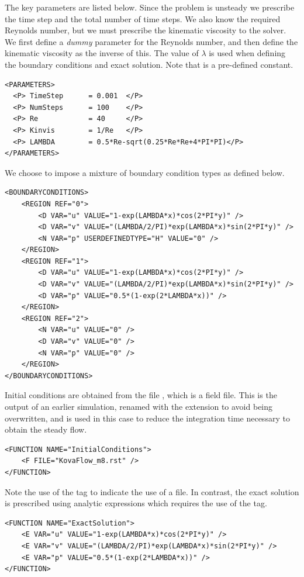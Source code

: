 The key parameters are listed below. Since the problem is unsteady we prescribe
the time step and the total number of time steps. We also know the required
Reynolds number, but we must prescribe the kinematic viscosity to the solver. We
first define a \emph{dummy} parameter for the Reynolds number, and then define
the kinematic viscosity as the inverse of this. The value of $\lambda$ is used
when defining the boundary conditions and exact solution. Note that 
is a pre-defined constant.

\begin{lstlisting}[style=XMLStyle]
<PARAMETERS>
  <P> TimeStep      = 0.001  </P>
  <P> NumSteps      = 100    </P>
  <P> Re            = 40     </P>
  <P> Kinvis        = 1/Re   </P>
  <P> LAMBDA        = 0.5*Re-sqrt(0.25*Re*Re+4*PI*PI)</P>
</PARAMETERS>
\end{lstlisting}

We choose to impose a mixture of boundary condition types as defined below.

\begin{lstlisting}[style=XMLStyle]
<BOUNDARYCONDITIONS>
    <REGION REF="0">
        <D VAR="u" VALUE="1-exp(LAMBDA*x)*cos(2*PI*y)" />
        <D VAR="v" VALUE="(LAMBDA/2/PI)*exp(LAMBDA*x)*sin(2*PI*y)" />
        <N VAR="p" USERDEFINEDTYPE="H" VALUE="0" />
    </REGION>
    <REGION REF="1">
        <D VAR="u" VALUE="1-exp(LAMBDA*x)*cos(2*PI*y)" />
        <D VAR="v" VALUE="(LAMBDA/2/PI)*exp(LAMBDA*x)*sin(2*PI*y)" />
        <D VAR="p" VALUE="0.5*(1-exp(2*LAMBDA*x))" />
    </REGION>
    <REGION REF="2">
        <N VAR="u" VALUE="0" />
        <D VAR="v" VALUE="0" />
        <N VAR="p" VALUE="0" />
    </REGION>
</BOUNDARYCONDITIONS>
\end{lstlisting}

Initial conditions are obtained from the file , which is
a \nekpp field file. This is the output of an earlier simulation, renamed with
the extension  to avoid being overwritten, and is used in this case
to reduce the integration time necessary to obtain the steady flow.
\begin{lstlisting}[style=XMLStyle]
<FUNCTION NAME="InitialConditions">
    <F FILE="KovaFlow_m8.rst" />
</FUNCTION>
\end{lstlisting}
Note the use of the  tag to indicate the use of a file. In contrast,
the exact solution is prescribed using analytic expressions which requires the
use of the  tag.
\begin{lstlisting}[style=XMLStyle]
<FUNCTION NAME="ExactSolution">
    <E VAR="u" VALUE="1-exp(LAMBDA*x)*cos(2*PI*y)" />
    <E VAR="v" VALUE="(LAMBDA/2/PI)*exp(LAMBDA*x)*sin(2*PI*y)" />
    <E VAR="p" VALUE="0.5*(1-exp(2*LAMBDA*x))" />
</FUNCTION>
\end{lstlisting}

